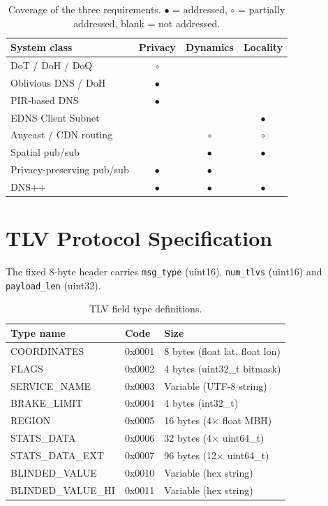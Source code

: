 \documentclass[10pt]{article}
\begin{document}
\begin{table}[H]
\centering
\caption{Coverage of the three requirements. $\bullet$ = addressed, $\circ$ = partially addressed, blank = not addressed.}
\small
\begin{tabular}{p{}ccc}
\toprule
System class & Privacy & Dynamics & Locality \\
\midrule
DoT / DoH / DoQ \citep{hu2016dot,hoffman2018doh,huitema2022doq} & $\circ$ & & \\
Oblivious DNS / DoH \citep{schmitt2019odoh,singanamalla2021odoh} & $\bullet$ & & \\
PIR-based DNS \citep{bhat2019pir,papadopoulos2020pir}           & $\bullet$ & & \\
EDNS Client Subnet \citep{contavalli2016ecs}                    & & & $\bullet$ \\
Anycast / CDN routing \citep{calder2015anycast}                 & & $\circ$ & $\circ$ \\
Spatial pub/sub \citep{gupta2004meghdoot,castro2002scribe}      & & $\bullet$ & $\bullet$ \\
Privacy-preserving pub/sub \citep{nabeel2012efficient}          & $\bullet$ & $\bullet$ & \\
\midrule
DNS++ \citep{rio2026dnspplus}                                   & $\bullet$ & $\bullet$ & $\bullet$ \\
\bottomrule
\end{tabular}
\end{table}

\section{TLV Protocol Specification}
\label{app:tlv}

The fixed 8-byte header carries \texttt{msg\_type} (uint16), \texttt{num\_tlvs} (uint16) and \texttt{payload\_len} (uint32).

\begin{table}[H]
\centering
\caption{TLV field type definitions.}
\label{tab:tlv}
\begin{tabular}{lll}
\toprule
Type name & Code & Size \\
\midrule
COORDINATES & 0x0001 & 8 bytes (float lat, float lon) \\
FLAGS & 0x0002 & 4 bytes (uint32\_t bitmask) \\
SERVICE\_NAME & 0x0003 & Variable (UTF-8 string) \\
BRAKE\_LIMIT & 0x0004 & 4 bytes (int32\_t) \\
REGION & 0x0005 & 16 bytes (4$\times$ float MBH) \\
STATS\_DATA & 0x0006 & 32 bytes (4$\times$ uint64\_t) \\
STATS\_DATA\_EXT & 0x0007 & 96 bytes (12$\times$ uint64\_t) \\
BLINDED\_VALUE & 0x0010 & Variable (hex string) \\
BLINDED\_VALUE\_HI & 0x0011 & Variable (hex string) \\
\bottomrule
\end{tabular}
\end{table}
\end{document}
